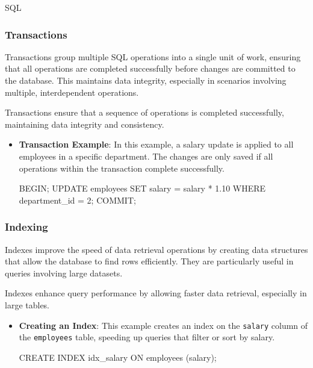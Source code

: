 \begin{notes}{SQL}
\begin{highlight}
    \end{highlight}
    
    \subsubsection*{Transactions}
    
    Transactions group multiple SQL operations into a single unit of work, ensuring that all operations are completed successfully before changes are committed to the database. This maintains data integrity, especially in scenarios involving multiple, interdependent operations.
    
    \begin{highlight}[Transactions]
    
        Transactions ensure that a sequence of operations is completed successfully, maintaining data integrity and consistency.
        
        \begin{itemize}
            \item \textbf{Transaction Example}: In this example, a salary update is applied to all employees in a specific department. The changes are only saved if all operations within the transaction complete successfully.
    \begin{code}[SQL]
    BEGIN;
    UPDATE employees SET salary = salary * 1.10 WHERE department_id = 2;
    COMMIT;
    \end{code}
        \end{itemize}
    
    \end{highlight}
    
    \subsubsection*{Indexing}
    
    Indexes improve the speed of data retrieval operations by creating data structures that allow the database to find rows efficiently. They are particularly useful in queries involving large datasets.
    
    \begin{highlight}[Indexing]
    
        Indexes enhance query performance by allowing faster data retrieval, especially in large tables.
        
        \begin{itemize}
            \item \textbf{Creating an Index}: This example creates an index on the \texttt{salary} column of the \texttt{employees} table, speeding up queries that filter or sort by salary.
    \begin{code}[SQL]
    CREATE INDEX idx_salary ON employees (salary);
    \end{code}
        \end{itemize}
    

\end{highlight}
\end{notes}
